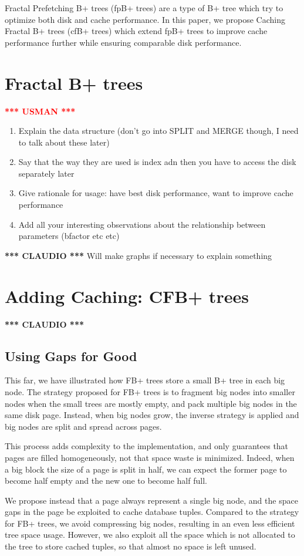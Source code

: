 \documentclass{article}
\newcommand{\usman}{\textcolor{Red}{\textbf{*** USMAN ***} }}
\newcommand{\claudio}{\textcolor{Cerulean}{\textbf{*** CLAUDIO ***} }}
\begin{document}
Fractal Prefetching B+ trees (fpB+ trees) are a type of B+ tree which try to optimize both disk and cache performance. In this paper, we propose Caching Fractal B+ trees (cfB+ trees) which extend fpB+ trees to improve cache performance further while ensuring comparable disk performance.

\section{Fractal B+ trees}
\usman
\begin{enumerate}
	\item Explain the data structure (don't go into SPLIT and MERGE though, I need to talk about these later)
	\item Say that the way they are used is index adn then you have to access the disk separately later 
	\item Give rationale for usage: have best disk performance, want to improve cache performance
	\item Add all your interesting observations about the relationship between parameters (bfactor etc etc)
\end{enumerate}
\claudio
Will make graphs if necessary to explain something

\section{Adding Caching: CFB+ trees}
\claudio
\subsection{Using Gaps for Good}
This far, we have illustrated how FB+ trees store a small B+ tree in each big node.
The strategy proposed for FB+ trees is to fragment big nodes into smaller nodes when the small trees
are mostly empty, and pack multiple big nodes in the same disk page.
Instead, when big nodes grow, the inverse strategy is applied and big nodes are split and spread
across pages.

This process adds complexity to the implementation, and only guarantees that pages are filled
homogeneously, not that space waste is minimized.
Indeed, when a big block the size of a page is split in half,
we can expect the former page to become half empty and the new one to become half full.

We propose instead that a page always represent a single big node, and the space gaps in the page
be exploited to cache database tuples.
Compared to the strategy for FB+ trees, we avoid compressing big nodes, resulting in an
even less efficient tree space usage.
However, we also exploit all the space which is not allocated to the tree to store cached tuples,
so that almost no space is left unused.
\end{document}
